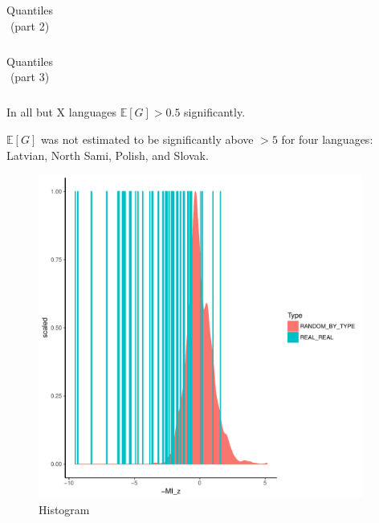 \documentclass[11pt,letterpaper]{article}
\newcommand{\E}[0]{\mathbb{E}}
\begin{document}
\begin{table}
\begin{longtable}{cccccccccccccccccc}

\end{longtable}
	\caption{Quantiles (part 2)}
\end{table}

\begin{table}
\begin{longtable}{cccccccccccccccccc}

\end{longtable}
	\caption{Quantiles (part 3)}
\end{table}




In all but X languages $\E[G] > 0.5$ significantly.

$\E[G]$ was not estimated to be significantly above $>5$ for four languages: Latvian, North Sami, Polish, and Slovak.





\begin{figure}
\includegraphics[width=0.95\textwidth]{neural/figures/full-REAL-listener-surprisal-memory-HIST_z_byMem_onlyWordForms_boundedVocab.pdf}
\caption{Histogram}\label{fig:hist-real}
\end{figure}
\end{document}
